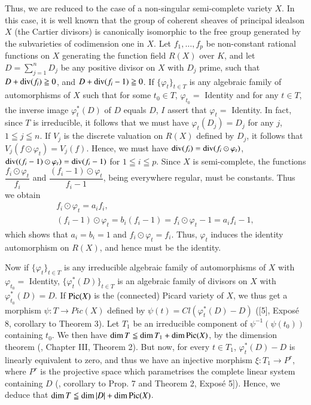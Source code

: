 Thus, we are reduced to the case of a non-singular semi-complete variety $X$. In this case, it is well known that the group of coherent sheaves of principal ideals\pageoriginale on $X$ (the Cartier divisors) is canonically isomorphic to the free group generated by the subvarieties of codimension one in $X$. Let $f_1, \ldots, f_p$ be non-constant rational functions on $X$ generating the function field $R(X)$ over $K$, and let $D = \sum\limits^n_{j=1} D_j$ be any positive divisor on $X$ with $D_j$ prime, such that $D + \operatorname{div} (f_i) \geqq 0$, and $D + \operatorname{div} (f_i - 1) \geqq 0$. If $\{\varphi_t\}_{t \in T}$ is any algebraic family of automorphisms of $X$ such that for some $t_0 \in T$, $\varphi_{t_0} = $ Identity and for any $t \in T$, the inverse image $\varphi^*_t (D)$ of $D$ equals $D$, $I$ assert that $\varphi_t = $ Identity. In fact, since $T$ is irreducible, it follows that we must have $\varphi_t (D_j) = D_j$ for any $j$, $1 \leqq j \leqq n$. If $V_j$ is the discrete valuation on $R(X)$ defined by $D_j$, it follows that $V_j (f \odot \varphi_t) = V_j (f)$. Hence, we must have $\operatorname{div} (f_i) =\operatorname{div} (f_i \odot \varphi_t)$, $\operatorname{div} ((f_i - 1) \odot \varphi_t) = \operatorname{div} (f_i -1)$ for $1 \leqq i \leqq p$. Since $X$ is semi-complete, the functions $\dfrac{f_i \odot \varphi_t}{f_i}$ and $\dfrac{(f_i -1) \odot \varphi_t}{f_i-1}$, being everywhere regular, must be constants. Thus  we obtain
\begin{gather*}
f_i \odot \varphi_t = a_i f_i,\\
(f_i -1) \odot \varphi_t = b_i (f_i -1) = f_i \odot \varphi_t -1 = a_i f_i -1 ,
\end{gather*}
which shows that $a_i = b_i =1$ and $f_i \odot \varphi_t = f_i$. Thus, $\varphi_t$ induces the identity automorphism on $R(X)$, and hence must be the identity.

Now if $\{\varphi_t\}_{t \in T}$ is any irreducible algebraic family of automorphisms of $X$ with $\varphi_{t_0} = $ Identity, $\{\varphi^*_t (D)\}_{t \in T}$ is an algebraic family of divisors on $X$ with $ \varphi^*_{t_0} (D) = D$. If $\operatorname{Pic}(X)$ is the (connected) Picard variety of $X$, we thus get a morphism $\psi: T \to Pic (X)$ defined by $\psi (t) = Cl (\varphi^*_t (D) - D)$ ([5], Expos\'e 8, corollary to Theorem 3). Let $T_1$ be an irreducible component of $\psi^{-1} (\psi(t_0))$ containing $t_0$. We then have $\dim T \leqq \dim T_1 + \dim  \operatorname{Pic} (X)$, by the dimension theorem (\cite{art6-key1}, Chapter III, Theorem 2). But now, for every $t \in T_1$, $\varphi^*_t (D) - D$ is linearly equivalent to zero, and thus we have an injective morphism $\xi: T_1 \to P^r$, where $P^r$ is the projective space which parametrises the complete linear system containing $D$ (\cite{art6-key5}, corollary to Prop. 7 and Theorem 2, Expos\'e 5]). Hence, we deduce that $\dim T \leqq \dim |D| + \dim \operatorname{Pic} (X)$.

